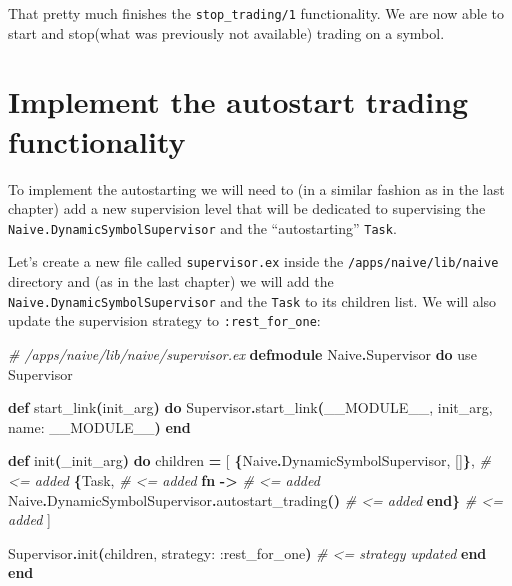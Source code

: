 \documentclass[
  oneside]{book}
\newenvironment{Shaded}{\begin{snugshade}}{\end{snugshade}}
\newcommand{\CommentTok}[1]{\textcolor[rgb]{0.56,0.35,0.01}{\textit{#1}}}
\newcommand{\ConstantTok}[1]{\textcolor[rgb]{0.56,0.35,0.01}{#1}}
\newcommand{\FunctionTok}[1]{\textcolor[rgb]{0.13,0.29,0.53}{\textbf{#1}}}
\newcommand{\ImportTok}[1]{#1}
\newcommand{\KeywordTok}[1]{\textcolor[rgb]{0.13,0.29,0.53}{\textbf{#1}}}
\newcommand{\NormalTok}[1]{#1}
\newcommand{\OperatorTok}[1]{\textcolor[rgb]{0.81,0.36,0.00}{\textbf{#1}}}
\newcommand{\OtherTok}[1]{\textcolor[rgb]{0.56,0.35,0.01}{#1}}
\newcommand{\VariableTok}[1]{\textcolor[rgb]{0.00,0.00,0.00}{#1}}
\begin{document}
That pretty much finishes the \texttt{stop\_trading/1} functionality. We are now able to start and stop(what was previously not available) trading on a symbol.

\section{Implement the autostart trading functionality}\label{implement-the-autostart-trading-functionality}

To implement the autostarting we will need to (in a similar fashion as in the last chapter) add a new supervision level that will be dedicated to supervising the \texttt{Naive.DynamicSymbolSupervisor} and the ``autostarting'' \texttt{Task}.

Let's create a new file called \texttt{supervisor.ex} inside the \texttt{/apps/naive/lib/naive} directory and (as in the last chapter) we will add the \texttt{Naive.DynamicSymbolSupervisor} and the \texttt{Task} to its children list. We will also update the supervision strategy to \texttt{:rest\_for\_one}:

\begin{Shaded}
\begin{Highlighting}[]
\CommentTok{\# /apps/naive/lib/naive/supervisor.ex}
\KeywordTok{defmodule} \ConstantTok{Naive}\OperatorTok{.}\ConstantTok{Supervisor} \KeywordTok{do}
  \ImportTok{use} \ConstantTok{Supervisor}

  \KeywordTok{def}\NormalTok{ start\_link}\FunctionTok{(}\NormalTok{init\_arg}\FunctionTok{)} \KeywordTok{do}
    \ConstantTok{Supervisor}\OperatorTok{.}\NormalTok{start\_link}\FunctionTok{(}\ConstantTok{\_\_MODULE\_\_}\NormalTok{, init\_arg, }\VariableTok{name:} \ConstantTok{\_\_MODULE\_\_}\FunctionTok{)}
  \KeywordTok{end}

  \KeywordTok{def}\NormalTok{ init}\FunctionTok{(}\NormalTok{\_init\_arg}\FunctionTok{)} \KeywordTok{do}
\NormalTok{    children }\OperatorTok{=} \OtherTok{[}
      \FunctionTok{\{}\ConstantTok{Naive}\OperatorTok{.}\ConstantTok{DynamicSymbolSupervisor}\NormalTok{, }\OtherTok{[]}\FunctionTok{\}}\NormalTok{,                 }\CommentTok{\# \textless{}= added}
      \FunctionTok{\{}\ConstantTok{Task}\NormalTok{,                                               }\CommentTok{\# \textless{}= added}
       \KeywordTok{fn} \OperatorTok{{-}\textgreater{}}                                               \CommentTok{\# \textless{}= added}
         \ConstantTok{Naive}\OperatorTok{.}\ConstantTok{DynamicSymbolSupervisor}\OperatorTok{.}\NormalTok{autostart\_trading}\FunctionTok{()} \CommentTok{\# \textless{}= added}
       \KeywordTok{end}\FunctionTok{\}}                                                \CommentTok{\# \textless{}= added}
    \OtherTok{]}

    \ConstantTok{Supervisor}\OperatorTok{.}\NormalTok{init}\FunctionTok{(}\NormalTok{children, }\VariableTok{strategy:} \VariableTok{:rest\_for\_one}\FunctionTok{)} \CommentTok{\# \textless{}= strategy updated}
  \KeywordTok{end}
\KeywordTok{end}
\end{Highlighting}
\end{Shaded}
\end{document}
